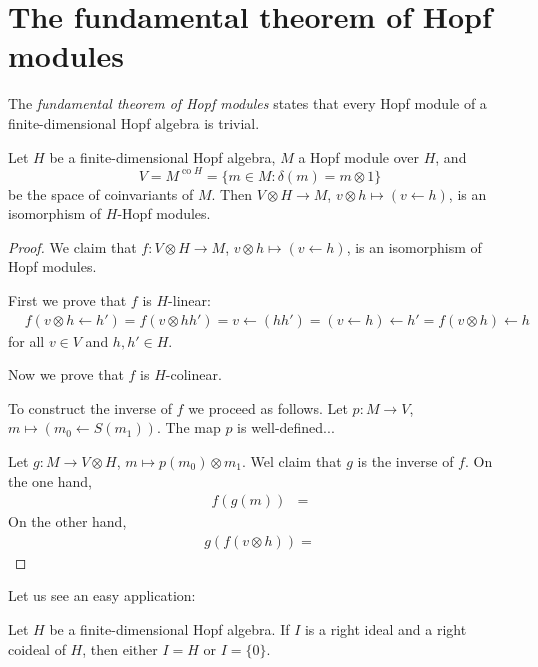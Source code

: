 \section{The fundamental theorem of Hopf modules}

The \emph{fundamental theorem of Hopf modules} states that every 
Hopf module of a finite-dimensional Hopf algebra 
is trivial.

\begin{theorem}
  \label{thm:HopfModules}
  Let $H$ be a finite-dimensional Hopf algebra, 
  $M$ a Hopf module over $H$, and 
  \[
    V=M^{\operatorname{co}H}=\{m\in M:\delta(m)=m\otimes 1\}
  \]
  be the space of coinvariants of $M$. 
  Then $V\otimes H\to M$, $v\otimes h\mapsto (v\leftarrow h)$, is an
  isomorphism of $H$-Hopf modules. 
\end{theorem}

\begin{proof}
  We claim that $f\colon V\otimes H\to M$, $v\otimes h\mapsto (v\leftarrow h)$,
  is an isomorphism of Hopf modules. 

  First we prove that $f$ is $H$-linear:
  \begin{align*}
    &f(v\otimes h\leftarrow h') = f(v\otimes hh')=v\leftarrow (hh')
    =(v\leftarrow h)\leftarrow h'=f(v\otimes h)\leftarrow h
  \end{align*}
  for all $v\in V$ and $h,h'\in H$. 

  Now we prove that $f$ is $H$-colinear. 

  To construct the inverse of $f$ we proceed as follows. Let 
  $p\colon M\to V$, $m\mapsto (m_0\leftarrow S(m_1))$. The 
  map $p$ is well-defined...
  
  Let $g\colon M\to V\otimes H$, $m\mapsto p(m_0)\otimes m_1$. Wel claim
  that $g$ is the inverse of $f$. On the one hand, 
  \begin{align*}
    f(g(m)) &= 
  \end{align*}
  On the other hand, 
  \begin{align*}
    g(f(v\otimes h))=
  \end{align*}
\end{proof}

Let us see an easy application:

\begin{corollary}
  Let $H$ be a finite-dimensional Hopf algebra. If $I$ is a right ideal and a
  right coideal of $H$, then either $I=H$ or $I=\{0\}$. 
\end{corollary}

